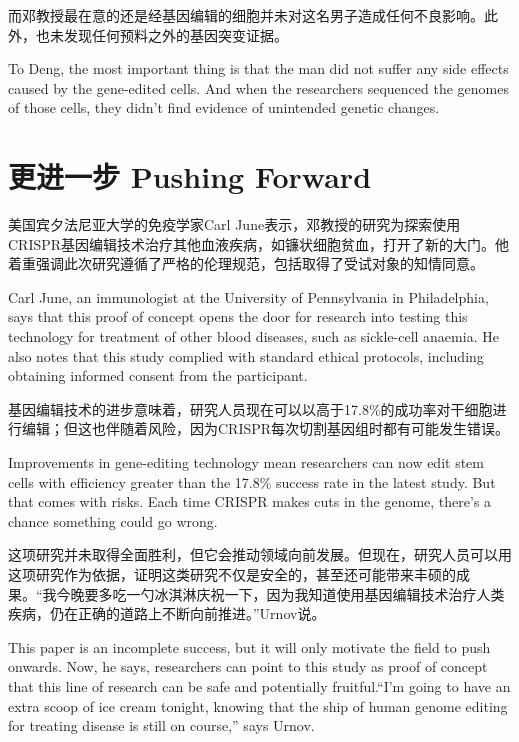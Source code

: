 \begin{multicols}{2}
而邓教授最在意的还是经基因编辑的细胞并未对这名男子造成任何不良影响。此外，也未发现任何预料之外的基因突变证据。

To Deng, the most important thing is that the man did not suffer any side effects caused by the gene-edited cells. And when the researchers sequenced the genomes of those cells, they didn’t find evidence of unintended genetic changes.

\section*{更进一步 Pushing Forward}

美国宾夕法尼亚大学的免疫学家Carl June表示，邓教授的研究为探索使用CRISPR基因编辑技术治疗其他血液疾病，如镰状细胞贫血，打开了新的大门。他着重强调此次研究遵循了严格的伦理规范，包括取得了受试对象的知情同意。

Carl June, an immunologist at the University of Pennsylvania in Philadelphia, says that this proof of concept opens the door for research into testing this technology for treatment of other blood diseases, such as sickle-cell anaemia. He also notes that this study complied with standard ethical protocols, including obtaining informed consent from the participant.

基因编辑技术的进步意味着，研究人员现在可以以高于17.8\%的成功率对干细胞进行编辑；但这也伴随着风险，因为CRISPR每次切割基因组时都有可能发生错误。

Improvements in gene-editing technology mean researchers can now edit stem cells with efficiency greater than the 17.8\% success rate in the latest study. But that comes with risks. Each time CRISPR makes cuts in the genome, there’s a chance something could go wrong. 

这项研究并未取得全面胜利，但它会推动领域向前发展。但现在，研究人员可以用这项研究作为依据，证明这类研究不仅是安全的，甚至还可能带来丰硕的成果。“我今晚要多吃一勺冰淇淋庆祝一下，因为我知道使用基因编辑技术治疗人类疾病，仍在正确的道路上不断向前推进。”Urnov说。

This paper is an incomplete success, but it will only motivate the field to push onwards. Now, he says, researchers can point to this study as proof of concept that this line of research can be safe and potentially fruitful.“I'm going to have an extra scoop of ice cream tonight, knowing that the ship of human genome editing for treating disease is still on course,” says Urnov.

\end{multicols}

